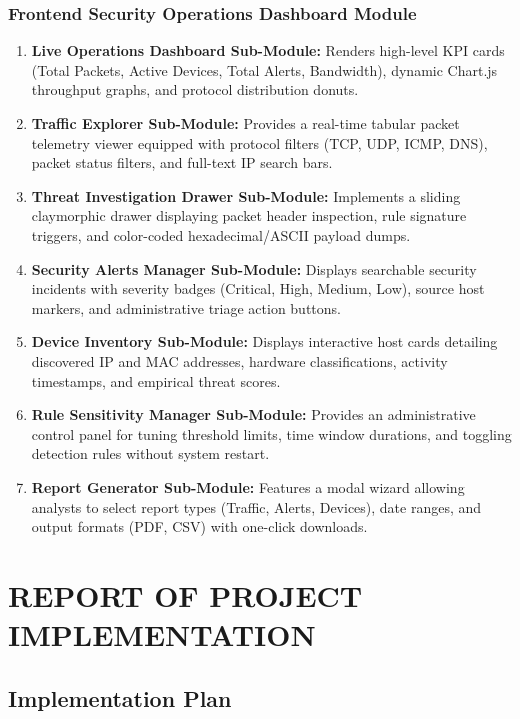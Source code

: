 \documentclass[a4paper,12pt]{report}
\begin{document}
	\subsection{Frontend Security Operations Dashboard Module}
	\begin{enumerate}
		\item \textbf{Live Operations Dashboard Sub-Module:} Renders high-level KPI cards (Total Packets, Active Devices, Total Alerts, Bandwidth), dynamic Chart.js throughput graphs, and protocol distribution donuts.
		\item \textbf{Traffic Explorer Sub-Module:} Provides a real-time tabular packet telemetry viewer equipped with protocol filters (TCP, UDP, ICMP, DNS), packet status filters, and full-text IP search bars.
		\item \textbf{Threat Investigation Drawer Sub-Module:} Implements a sliding claymorphic drawer displaying packet header inspection, rule signature triggers, and color-coded hexadecimal/ASCII payload dumps.
		\item \textbf{Security Alerts Manager Sub-Module:} Displays searchable security incidents with severity badges (Critical, High, Medium, Low), source host markers, and administrative triage action buttons.
		\item \textbf{Device Inventory Sub-Module:} Displays interactive host cards detailing discovered IP and MAC addresses, hardware classifications, activity timestamps, and empirical threat scores.
		\item \textbf{Rule Sensitivity Manager Sub-Module:} Provides an administrative control panel for tuning threshold limits, time window durations, and toggling detection rules without system restart.
		\item \textbf{Report Generator Sub-Module:} Features a modal wizard allowing analysts to select report types (Traffic, Alerts, Devices), date ranges, and output formats (PDF, CSV) with one-click downloads.
	\end{enumerate}
	
	\chapter{REPORT OF PROJECT IMPLEMENTATION}
	
	\section{Implementation Plan}
\end{document}
